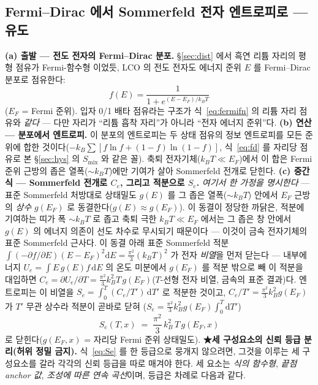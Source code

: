 \documentclass[11pt,a4paper]{article}
\newcommand{\dd}{\mathrm{d}}
\begin{document}
\subsection{Fermi--Dirac 에서 Sommerfeld 전자 엔트로피로 — 유도}\label{sec:lco-Se}
\textbf{(a) 출발 — 전도 전자의 Fermi--Dirac 분포.} \S\ref{sec:dist} 에서 흑연 리튬 자리의 평형 점유가 Fermi-함수형
이었듯, LCO 의 전도 전자도 에너지 준위 $E$ 를 Fermi--Dirac 분포로 점유한다:
\begin{equation}
f(E)=\frac{1}{1+e^{(E-E_F)/k_BT}}
\label{eq:fd}
\end{equation}
($E_F$ = Fermi 준위). 입자 0/1 배타 점유라는 구조가 식~\eqref{eq:fermifn} 의 리튬 자리 점유와 \emph{같다} — 다만 자리가
``리튬 흡착 자리''가 아니라 ``전자 에너지 준위''다. \textbf{(b) 연산 — 분포에서 엔트로피.} 이 분포의 엔트로피는 두 상태
점유의 정보 엔트로피를 모든 준위에 합한 것이다($-k_B\sum[f\ln f+(1-f)\ln(1-f)]$, 식~\eqref{eq:fd} 를 자리당 점유로 본
\S\ref{sec:hys} 의 $S_\mathrm{mix}$ 와 같은 꼴). 축퇴 전자기체($k_BT\!\ll\!E_F$)에서 이 합은 Fermi 준위 근방의 좁은
열폭($\sim k_BT$)에만 기여가 살아 Sommerfeld 전개로 닫힌다. \textbf{(c) 중간식 — Sommerfeld 전개로 $C_e$, 그리고 적분으로 $S_e$.}
\emph{여기서 한 가정을 명시한다} — 표준 Sommerfeld 처방대로 상태밀도 $g(E)$ 를 그 좁은 열폭($\sim k_BT$) 안에서
$E_F$ 근방의 \emph{상수} $g(E_F)$ 로 동결한다($g(E)\approx g(E_F)$). 이 동결이 정당한 까닭은, 적분에 기여하는 띠가
폭 $\sim k_BT$ 로 좁고 축퇴 극한 $k_BT\!\ll\!E_F$ 에서는 그 좁은 창 안에서 $g(E)$ 의 에너지 의존이 선도 차수로
무시되기 때문이다 — 이것이 금속 전자기체의 표준 Sommerfeld 근사다. 이 동결 아래 표준 Sommerfeld 적분
$\int(-\partial f/\partial E)(E-E_F)^2\dd E=\tfrac{\pi^2}{3}(k_BT)^2$ 가
전자 \emph{비열}을 먼저 닫는다 — 내부에너지 $U_e=\int E\,g(E)f\,\dd E$ 의 온도 미분에서 $g(E_F)$ 를 적분 밖으로 빼
이 적분을 대입하면
$C_e=\partial U_e/\partial T=\tfrac{\pi^2}{3}k_B^2T\,g(E_F)$($T$-선형 전자 비열, 금속의 표준 결과)다. 엔트로피는 이
비열을 $S_e=\int_0^T (C_e/T')\,\dd T'$ 로 적분한 것이고, $C_e/T'=\tfrac{\pi^2}{3}k_B^2g(E_F)$ 가 $T'$ 무관 상수라
적분이 곧바로 닫혀 ($S_e=\tfrac{\pi^2}{3}k_B^2 g(E_F)\int_0^T\dd T'$)
\begin{equation}
S_e(T,x)\;=\;\frac{\pi^2}{3}\,k_B^2\,T\,g(E_F,x)
\label{eq:Se}
\end{equation}
로 닫힌다($g(E_F,x)$ = 자리당 Fermi 준위 상태밀도). \textbf{★세 구성요소의 신뢰 등급 분리(허위 정밀 금지).}
식~\eqref{eq:Se} 를 한 등급으로 뭉개지 않으려면, 그것을 이루는 세 구성요소를 갈라 각각의 신뢰 등급을 따로 매겨야 한다.
세 요소는 \emph{식의 함수형}, \emph{끝점 anchor 값}, \emph{조성에 따른 연속 곡선}이며, 등급은 차례로 다음과 같다.
\end{document}
